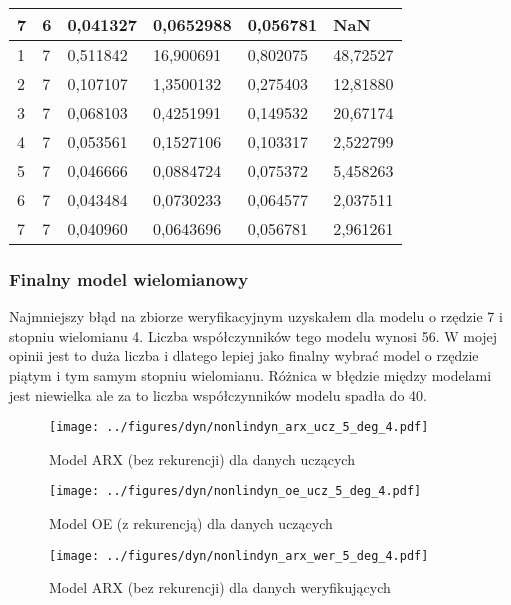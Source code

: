 \documentclass[a4paper,titlepage,11pt,floatssmall]{mwrep}
\begin{document}
\begin{table}[H]
\begin{tabular}{|l|l|l|l|l|l|}
7           & 6             & 0,041327 & 0,0652988 & 0,056781 & NaN      \\ \hline
1           & 7             & 0,511842 & 16,900691 & 0,802075 & 48,72527 \\ \hline
2           & 7             & 0,107107 & 1,3500132 & 0,275403 & 12,81880  \\ \hline
3           & 7             & 0,068103 & 0,4251991 & 0,149532 & 20,67174  \\ \hline
4           & 7             & 0,053561 & 0,1527106 & 0,103317 & 2,522799 \\ \hline
5           & 7             & 0,046666 & 0,0884724 & 0,075372 & 5,458263  \\ \hline
6           & 7             & 0,043484 & 0,0730233 & 0,064577 & 2,037511  \\ \hline
7           & 7             & 0,040960 & 0,0643696 & 0,056781 & 2,961261  \\ \hline
\end{tabular}
\end{table}



\subsubsection{Finalny model wielomianowy}

Najmniejszy błąd na zbiorze weryfikacyjnym uzyskałem dla modelu o rzędzie 7 i stopniu wielomianu 4. Liczba współczynników tego modelu wynosi 56. W mojej opinii jest to duża liczba i dlatego lepiej jako finalny wybrać model o rzędzie piątym i tym samym stopniu wielomianu. Różnica w błędzie między modelami jest niewielka ale za to liczba współczynników modelu spadła do 40.
\bigskip

\begin{figure}[H]
\centering
\texttt{[image: ../figures/dyn/nonlindyn\_arx\_ucz\_5\_deg\_4.pdf]}
\caption{Model ARX (bez rekurencji) dla danych uczących}
\end{figure}
\newpage
\begin{figure}[H]
\centering
\texttt{[image: ../figures/dyn/nonlindyn\_oe\_ucz\_5\_deg\_4.pdf]}
\caption{Model OE (z rekurencją) dla danych uczących}
\end{figure}

\begin{figure}[H]
\centering
\texttt{[image: ../figures/dyn/nonlindyn\_arx\_wer\_5\_deg\_4.pdf]}
\caption{Model ARX (bez rekurencji) dla danych weryfikujących}
\end{figure}
\end{document}
